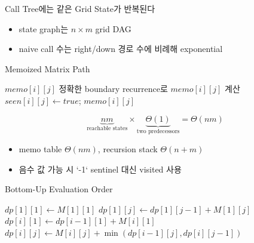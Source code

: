 \begin{frame}{Call Tree에는 같은 Grid State가 반복된다}
\centering{}
\begin{itemize}\item state graph는 $n\times m$ grid DAG\item naive call 수는 right/down 경로 수에 비례해 exponential\end{itemize}
\end{frame}
\begin{frame}{Memoized Matrix Path}
\small\begin{algorithmic}[1]
\State\Return $memo[i][j]$\EndIf
\State 정확한 boundary recurrence로 $memo[i][j]$ 계산
\State $seen[i][j]\gets true$; \Return $memo[i][j]$
\EndProcedure
\end{algorithmic}
\[
\underbrace{nm}_{\text{reachable states}}\times
\underbrace{\Theta(1)}_{\text{two predecessors}}=\Theta(nm)
\]
\begin{itemize}\item memo table $\Theta(nm)$, recursion stack $\Theta(n+m)$\item 음수 값 가능 시 `-1` sentinel 대신 visited 사용\end{itemize}
\end{frame}
\begin{frame}{Bottom-Up Evaluation Order}
\small\begin{algorithmic}[1]
\State $dp[1][1]\gets M[1][1]$
\State $dp[1][j]\gets dp[1][j-1]+M[1][j]$\EndFor
{}\State $dp[i][1]\gets dp[i-1][1]+M[i][1]$\EndFor
{}
\State $dp[i][j]\gets M[i][j]+\min(dp[i-1][j],dp[i][j-1])$
\EndFor\EndFor
\end{algorithmic}
\end{frame}
